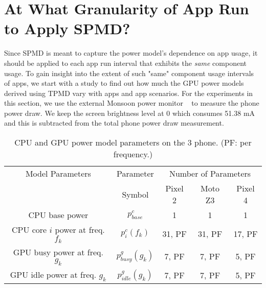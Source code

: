 \section{At What Granularity of App Run to Apply SPMD?}
\label{sec:primer}

Since SPMD is meant to capture the power model's dependence on app usage, it should be applied to 
each app run interval that exhibits the {\em same} component usage.
To gain insight into the extent of such "same" component usage intervals of apps,
we start with a study to find out  how much the GPU power models derived using TPMD vary with
apps and app scenarios. 
For the experiments in this section,
we use the external Monsoon power monitor ~\cite{monsoonpowermonitor} to measure the phone power draw.
We keep the screen brightness level at 0 which consumes 51.38 mA and this is subtracted
from the total phone power draw measurement.

\begin{table}[t]
{\footnotesize
    \centering
    \caption{CPU and GPU power model parameters on the 3 phone. (PF: per frequency.)}
    \vspace{-0.1in}
    \begin{tabular}{|c|c|c|c|c|}
         \hline
         Model Parameters & Parameter  & \multicolumn{3}{c|}{Number of Parameters}\\
         \cline{3-5}
          & Symbol & Pixel 2 & Moto Z3 & Pixel 4\\
         \hline
        CPU base power                          & $p^c_{base}$          &  1      &   1       & 1\\
        CPU core $i$ power at freq. $f_k$       & $p^c_i(f_k)$          & 31, PF  &  31, PF   & 17, PF\\
        GPU busy power at freq. $g_k$           & $p^g_{busy}(g_k)$     &  7, PF  &   7, PF   & 5, PF\\
        GPU idle power at freq. $g_k$           & $p^g_{idle}(g_k)$     &  7, PF  &   7, PF   & 5, PF\\
         \hline
    \end{tabular}
    \label{tab:parameters}
    \vspace{-0.1in}
}
\end{table}

